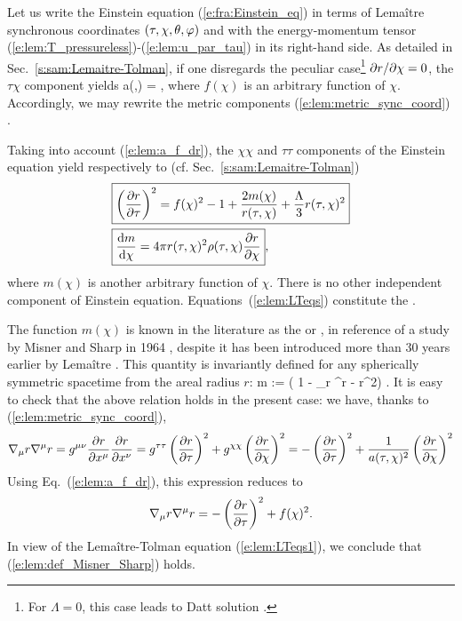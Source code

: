 Let us write the Einstein equation (\ref{e:fra:Einstein_eq})
in terms of Lemaître synchronous coordinates $(\tau,\chi,\theta,\varphi)$
and with the energy-momentum tensor (\ref{e:lem:T_pressureless})-(\ref{e:lem:u_par_tau})
in its right-hand side.
As detailed in Sec.~\ref{s:sam:Lemaitre-Tolman},
if one disregards the peculiar case\footnote{For $\Lambda=0$, this case leads to
Datt solution \cite{Datt38}.} ${\partial r}/{\partial \chi} = 0$,
the $\tau\chi$ component yields
\be \label{e:lem:a_f_dr}
    a(\tau,\chi) =   ,
\ee
where $f(\chi)$ is an arbitrary function of $\chi$.
Accordingly, we may rewrite the metric components (\ref{e:lem:metric_sync_coord})
\be \label{e:lem:metric_Lemaitre}
     .
\ee

Taking into account (\ref{e:lem:a_f_dr}), the $\chi\chi$ and $\tau\tau$ components of the Einstein equation
yield respectively to (cf. Sec.~\ref{s:sam:Lemaitre-Tolman})
\begin{subequations}\label{e:lem:LTeqs}
\begin{align}
 & \fbox{$\displaystyle \left( \frac{\partial r}{\partial \tau} \right) ^2 = f(\chi)^2 - 1 + \frac{2m(\chi)}{r(\tau,\chi)}
   + \frac{\Lambda}{3} r(\tau,\chi)^2 $} \label{e:lem:LTeqs1} \\
 & \fbox{$\displaystyle \frac{\mathrm{d} m}{\mathrm{d}\chi} = 4\pi r(\tau,\chi)^2 \rho(\tau,\chi) \frac{\partial r}{\partial \chi} $} ,
    \label{e:lem:LTeqs2}
 \end{align}
\end{subequations}
where $m(\chi)$ is another arbitrary function of $\chi$.
There is no other independent component of Einstein equation.
Equations~(\ref{e:lem:LTeqs}) constitute the
.

The function $m(\chi)$ is known in the literature as the  or , in reference
of a study by Misner and Sharp in 1964 \cite{MisneS64}, despite it has been introduced
more than 30 years earlier by Lemaître \cite{Lemai32}. This quantity is
invariantly defined for any spherically symmetric spacetime from the areal radius $r$:
\be \label{e:lem:def_Misner_Sharp}
    m  :=  \left( 1 - \nabla_\mu r \nabla^\mu r  -  r^2\right) .
\ee
It is easy to check that the above relation holds in the present case:
we have, thanks to (\ref{e:lem:metric_sync_coord}),
\[
    \nabla_\mu r \nabla^\mu r = g^{\mu\nu} \frac{\partial r}{\partial x^\mu} \frac{\partial r}{\partial x^\nu}
        = g^{\tau\tau} \left( \frac{\partial r}{\partial \tau} \right)^2
        + g^{\chi\chi} \left( \frac{\partial r}{\partial \chi} \right)^2
        = - \left( \frac{\partial r}{\partial \tau} \right)^2 + \frac{1}{a(\tau,\chi)^2} \left( \frac{\partial r}{\partial \chi} \right)^2
\]
Using Eq.~(\ref{e:lem:a_f_dr}), this expression reduces to
\[
    \nabla_\mu r \nabla^\mu r = - \left( \frac{\partial r}{\partial \tau} \right)^2 + f(\chi)^2 .
\]
In view of the Lemaître-Tolman equation (\ref{e:lem:LTeqs1}), we conclude that
(\ref{e:lem:def_Misner_Sharp}) holds.

